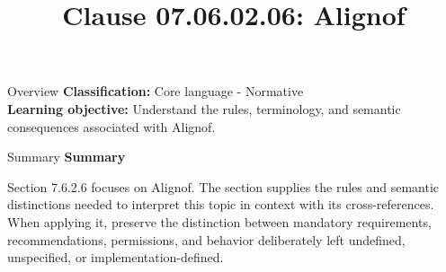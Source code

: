 \documentclass[10pt,letterpaper]{article}
\title{Clause 07.06.02.06: Alignof}
\author{}
\date{}
\begin{document}
\maketitle
\begin{CornellOverviewBox}{Overview}
\textbf{Classification:} Core language - Normative\\[2pt]
\textbf{Learning objective:} Understand the rules, terminology, and semantic consequences associated with Alignof.
\end{CornellOverviewBox}\begin{CornellSummaryBox}{Summary}
{\sffamily\bfseries\color{Accent} Summary}\par\vspace{3pt}Section 7.6.2.6 focuses on Alignof. The section supplies the rules and semantic distinctions needed to interpret this topic in context with its cross-references. When applying it, preserve the distinction between mandatory requirements, recommendations, permissions, and behavior deliberately left undefined, unspecified, or implementation-defined.
\end{CornellSummaryBox}
\end{document}
